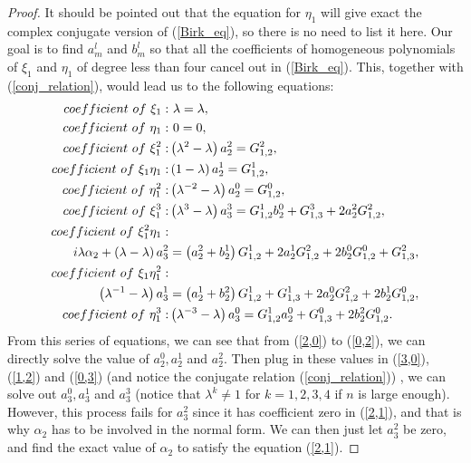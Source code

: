 \documentclass[10pt,a4paper]{amsart}
\begin{document}
\begin{proof}
It should be pointed out that the equation for \(\eta_1\) will give 
exact the complex conjugate version of (\ref*{Birk_eq}), so there is no need to list
it here. Our goal is to find $a_m^l$ and $b_m^l$ so that all the coefficients of homogeneous polynomials of $\xi_1$ and $\eta_1$ of degree less than four cancel out in (\ref{Birk_eq}). This, together with (\ref{conj_relation}), would lead us to the following equations:
\begin{align}
    {\rm coefficient\ of\ } \xi_1: &\ \lambda=\lambda,\notag \\
	{\rm coefficient\ of\ } \eta_1:&\ 0=0,\notag \\
	\label{2,0} {\rm coefficient\ of\ }\xi_1^2:& \left(\lambda^2-\lambda\right)a_2^2=G_{1,2}^2,\\
	\label{1,1} {\rm coefficient\ of\ }\xi_1\eta_1:& \left(1-\lambda\right)a_2^1=G_{1,2}^1,\\
	\label{0,2} {\rm coefficient\ of\ }\eta_1^2:& \left(\lambda^{-2}-\lambda\right)a_2^0=G_{1,2}^0,\\
	\label{3,0} {\rm coefficient\ of\ }\xi_1^3:& \left(\lambda^3-\lambda\right)a_3^3=G_{1,2}^1b_2^0+G_{1,3}^3+2a_2^2G_{1,2}^2,\\
	\label{2,1} {\rm coefficient\ of\ } \xi_1^2\eta_1:&\\
	  i\lambda\alpha_{2} + \left(\lambda-\lambda \right)a_{3}^{2}&= \left( a_{2}^{2} + b_{2}^{1} \right)G_{1,2}^{1} +2a_2^1G_{1,2}^2+2b_2^0G_{1,2}^0+ G_{1,3}^{2},\\
    \label{1,2} {\rm coefficient\ of\ }\xi_1\eta_1^2:&\\
     \left(\lambda^{-1}-\lambda\right)a_3^1&= \left( a_{2}^{1} + b_{2}^{2} \right)G_{1,2}^{1}+G_{1,3}^1+2a_2^0G_{1,2}^2+2b_2^1G_{1,2}^0,\\
	\label{0,3} {\rm coefficient\ of\ } \eta_1^3:& \left(\lambda^{-3}-\lambda\right)a_3^0=G_{1,2}^1a_2^0+G_{1,3}^0+2b_2^2G_{1,2}^0.
\end{align}
From this series of equations, we can see that from (\ref{2,0}) to (\ref{0,2}), we can directly solve the value of $a_2^0,a_2^1$ and $a_2^2$. Then plug in these values in (\ref{3,0}), (\ref{1,2}) and (\ref{0,3}) (and notice the conjugate relation (\ref{conj_relation})) , we can solve out $a_3^0,a_3^1$ and $a_3^3$ (notice that \(\lambda^{k} \neq 1\) for \(k = 1,2,3,4\) if
\(n\) is large enough). However, this process fails for $a_3^2$ since it has coefficient zero in (\ref{2,1}), and that is why $\alpha_2$ has to be involved in the normal form. We can then just let $a_3^2$ be zero, and find the exact value of $\alpha_2$ to satisfy the equation (\ref{2,1}). 


\end{proof}
\end{document}
